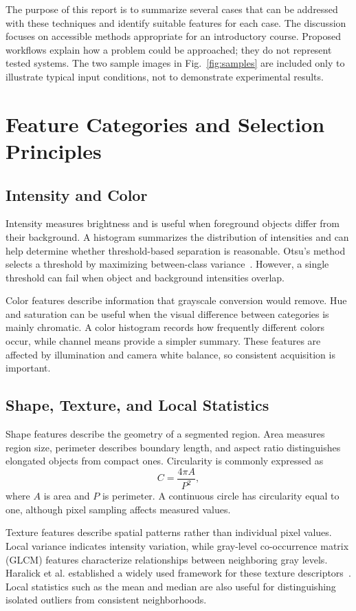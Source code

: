 \documentclass[conference]{IEEEtran}
\begin{document}
The purpose of this report is to summarize several cases that can be addressed with these techniques and identify suitable features for each case. The discussion focuses on accessible methods appropriate for an introductory course. Proposed workflows explain how a problem could be approached; they do not represent tested systems. The two sample images in Fig.~\ref{fig:samples} are included only to illustrate typical input conditions, not to demonstrate experimental results.

\section{Feature Categories and Selection Principles}
\subsection{Intensity and Color}
Intensity measures brightness and is useful when foreground objects differ from their background. A histogram summarizes the distribution of intensities and can help determine whether threshold-based separation is reasonable. Otsu's method selects a threshold by maximizing between-class variance~\cite{otsu1979}. However, a single threshold can fail when object and background intensities overlap.

Color features describe information that grayscale conversion would remove. Hue and saturation can be useful when the visual difference between categories is mainly chromatic. A color histogram records how frequently different colors occur, while channel means provide a simpler summary. These features are affected by illumination and camera white balance, so consistent acquisition is important.

\subsection{Shape, Texture, and Local Statistics}
Shape features describe the geometry of a segmented region. Area measures region size, perimeter describes boundary length, and aspect ratio distinguishes elongated objects from compact ones. Circularity is commonly expressed as
\begin{equation}
C=\frac{4\pi A}{P^2},
\end{equation}
where $A$ is area and $P$ is perimeter. A continuous circle has circularity equal to one, although pixel sampling affects measured values.

Texture features describe spatial patterns rather than individual pixel values. Local variance indicates intensity variation, while gray-level co-occurrence matrix (GLCM) features characterize relationships between neighboring gray levels. Haralick et al. established a widely used framework for these texture descriptors~\cite{haralick1973}. Local statistics such as the mean and median are also useful for distinguishing isolated outliers from consistent neighborhoods.
\end{document}
